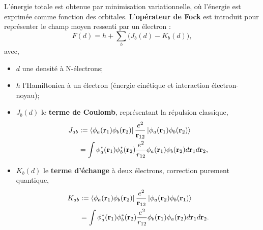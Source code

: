 \documentclass[12pt,a4paper]{article} %
\numberwithin{equation}{section} %
\numberwithin{figure}{section} %
\numberwithin{table}{section} %
\begin{document}
L'énergie totale est obtenue par minimisation variationnelle, où l'énergie est exprimée comme fonction des orbitales. L'\textbf{opérateur de Fock} est introduit pour représenter le champ moyen ressenti par un électron :
\begin{equation}
F(d) = h + \sum_b \big(J_b(d) - K_b(d)\big) ,
\end{equation}
avec,
\begin{itemize}
\item $d$ une densité à N-électrons;
\item $h$ l'Hamiltonien à un électron (énergie cinétique et interaction électron-noyau);
\item  $J_b(d)$ le \textbf{terme de Coulomb}, représentant la répulsion classique,
    \begin{equation}
\begin{split}
        J_{ab} &:=\bra{\phi_a(\vb{r}_1)\phi_b(\vb{r}_2)}\frac{e^2}{\vb{r}_{12}}
        \ket{\phi_a(\vb{r}_1)\phi_b(\vb{r}_2)}\\
        &= \int \phi_a^*(\mathbf{r}_1) \phi_b^*(\mathbf{r}_2) \frac{e^2}{r_{12}} \phi_a(\mathbf{r}_1) \phi_b(\mathbf{r}_2) d\mathbf{r}_1 d\mathbf{r}_2,
\end{split}
    \end{equation}
\item $K_b(d)$ le \textbf{terme d’échange} à deux électrons, correction purement quantique,
    \begin{equation}
    \begin{split}
    K_{ab} & :=\bra{\phi_a(\vb{r}_1)\phi_b(\vb{r}_2)}\frac{e^2}{\vb{r}_{12}}
    \ket{\phi_a(\vb{r}_2)\phi_b(\vb{r}_1)}\\
    &= \int \phi_a^*(\mathbf{r}_1) \phi_b^*(\mathbf{r}_2) \frac{e^2}{r_{12}} \phi_b(\mathbf{r}_1) \phi_a(\mathbf{r}_2) d\mathbf{r}_1 d\mathbf{r}_2.
    \end{split}
    \end{equation}
\end{itemize}
\end{document}
